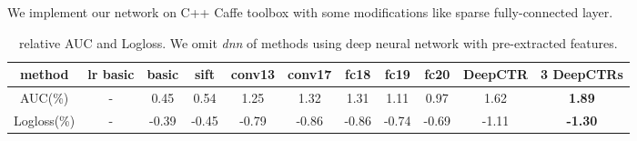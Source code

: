 \documentclass{sig-alternate}
\begin{document}
We implement our network on C++ Caffe toolbox \cite{jia2014caffe} with some modifications like sparse fully-connected layer.
\begin{table}
	\centering
	\caption{relative AUC and Logloss. We omit \emph{dnn} of methods using deep neural network with pre-extracted features.}
	\label{table:AUC}
	\begin{tabular}{|c|c cc|c c c c c|c c|} \hline
		method  & lr basic & basic &sift &conv13 &conv17 &fc18 &fc19 &fc20 &DeepCTR &3 DeepCTRs \\  \hline
		AUC(\%) & -        & 0.45  &0.54 &  1.25 &1.32   &1.31 &1.11 &0.97 &1.62    &\textbf{1.89} \\  \hline
		Logloss(\%)&-      & -0.39 &-0.45& -0.79 & -0.86 &-0.86&-0.74&-0.69&-1.11   & \textbf{-1.30}\\ \hline
	\end{tabular}
\end{table}
\end{document}
